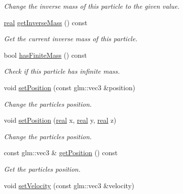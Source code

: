 \begin{DoxyCompactItemize}
\begin{DoxyCompactList}\small\item\em Change the inverse mass of this particle to the given value. \end{DoxyCompactList}\item 
\mbox{\hyperlink{namespacer3_ab2016b3e3f743fb735afce242f0dc1eb}{real}} \mbox{\hyperlink{classr3_1_1_particle_a6924e65c0aacb7e50057e43be134156b}{get\+Inverse\+Mass}} () const
\begin{DoxyCompactList}\small\item\em Get the current inverse mass of this particle. \end{DoxyCompactList}\item 
bool \mbox{\hyperlink{classr3_1_1_particle_a7517367ac5587d97d783429585ec0e90}{has\+Finite\+Mass}} () const
\begin{DoxyCompactList}\small\item\em Check if this particle has infinite mass. \end{DoxyCompactList}\item 
void \mbox{\hyperlink{classr3_1_1_particle_a22926644001b62f3e8bf1f9cf02b64e9}{set\+Position}} (const glm\+::vec3 \&position)
\begin{DoxyCompactList}\small\item\em Change the particle\textquotesingle{}s position. \end{DoxyCompactList}\item 
void \mbox{\hyperlink{classr3_1_1_particle_ac0d83f2396049b51383c692a70c44b34}{set\+Position}} (\mbox{\hyperlink{namespacer3_ab2016b3e3f743fb735afce242f0dc1eb}{real}} x, \mbox{\hyperlink{namespacer3_ab2016b3e3f743fb735afce242f0dc1eb}{real}} y, \mbox{\hyperlink{namespacer3_ab2016b3e3f743fb735afce242f0dc1eb}{real}} z)
\begin{DoxyCompactList}\small\item\em Change the particle\textquotesingle{}s position. \end{DoxyCompactList}\item 
const glm\+::vec3 \& \mbox{\hyperlink{classr3_1_1_particle_a6f61c64625f2d9bf7fe1145d74790a92}{get\+Position}} () const
\begin{DoxyCompactList}\small\item\em Get the particle\textquotesingle{}s position. \end{DoxyCompactList}\item 
void \mbox{\hyperlink{classr3_1_1_particle_ae0e84b5875dcf2dc6850ba8698f8f936}{set\+Velocity}} (const glm\+::vec3 \&velocity)

\end{DoxyCompactItemize}

